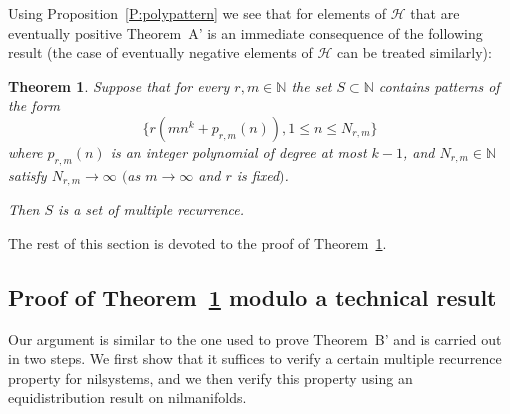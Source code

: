 \documentclass[11pt]{amsart}
\renewcommand{\H}{\mathcal{H}}
\newcommand{\N}{\mathbb{N}}
\theoremstyle{plain}
\newtheorem{theorem}{Theorem}[section]
\theoremstyle{definition}
\theoremstyle{remark}
\begin{document}
Using Proposition~\ref{P:polypattern} we see  that for elements of  $\H$ that are
eventually positive Theorem~A' is an
immediate consequence of the following result (the case of eventually negative elements of $\H$
can be treated similarly):
\begin{theorem}\label{T:recurrencepoly}
  Suppose that for every $r,m\in\N$ the set $S\subset \N$ contains
  patterns of the form
$$
\{r(mn^k+p_{r,m}(n)), 1\leq n\leq N_{r,m}\}
$$
where $p_{r,m}(n)$ is an integer polynomial of degree at most $k-1$,
and $N_{r,m}\in\N$ satisfy $N_{r,m}\to\infty$ $($as $m\to\infty$ and $r$
is fixed$)$.

Then $S$ is a set of multiple recurrence.
\end{theorem}
The rest of this section is devoted to the proof of
Theorem~\ref{T:recurrencepoly}.




\subsection{Proof of Theorem~\ref{T:recurrencepoly}  modulo a technical result}\label{SS:mainargument}
Our argument is similar to the one used to prove Theorem~B' and is
carried out in two steps. We first show that it suffices to verify a certain
multiple recurrence property for nilsystems, and we then verify this property
using an equidistribution result on nilmanifolds.
\end{document}
